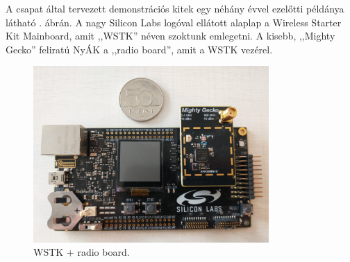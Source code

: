 \documentclass[a4paper,12pt,titlepage]{article}
\begin{document}
        \par
        A csapat által tervezett demonstrációs kitek egy néhány évvel ezelőtti példánya látható . ábrán. A nagy Silicon Labs logóval ellátott alaplap a Wireless Starter Kit Mainboard, amit ,,WSTK'' néven szoktunk emlegetni. A kisebb, ,,Mighty Gecko'' feliratú NyÁK a ,,radio board'', amit a WSTK vezérel.
%
            \begin{figure}
                \centering
                \includegraphics[width=0.8\textwidth]{kep/szerkesztett/wstk-mighty-gecko-nagy.jpg}
                \caption{WSTK + radio board.}
                \label{fig:wstkmighty}
            \end{figure}
%
\end{document}
